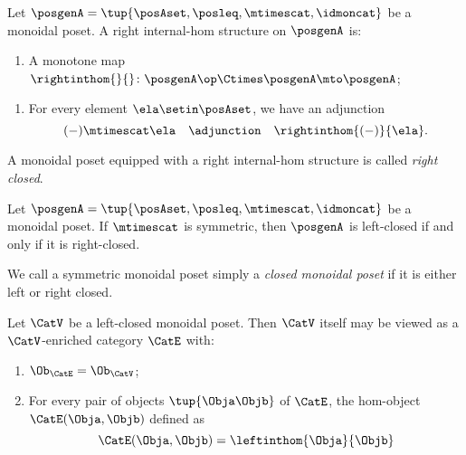 \begin{ctdefinition}
    \label{def:right-internal-hom-monoidal-poset}
    Let $\posgenA = \tup{\posAset, \posleq, \mtimescat, \idmoncat}$ be a monoidal poset.
    A right internal-hom structure on $\posgenA$ is:

    \constit
    \begin{enumerate}
        \item A monotone map $\rightinthom{}{} \colon \posgenA\op \Ctimes \posgenA \mto \posgenA$;
    \end{enumerate}

    \condit
    \begin{enumerate}
        \item For every element $\ela \setin \posAset$, we have an adjunction
              \begin{equation}
                  ( - ) \mtimescat \ela \quad \adjunction \quad \rightinthom{(-)}{\ela} .
              \end{equation}
    \end{enumerate}
    A monoidal poset equipped with a right internal-hom structure is called \emph{right closed}.
\end{ctdefinition}

\begin{lemma}
    \label{lem:symmetric-left-right-closed-monoidal-poset-cat}
    Let $\posgenA = \tup{\posAset, \posleq, \mtimescat, \idmoncat}$ be a monoidal poset.
    If $\mtimescat$ is symmetric, then $\posgenA$ is left-closed if and only if it is right-closed.
\end{lemma}

\begin{ctdefinition}
    \label{def:moindal-poset-cat-closed}
    We call a symmetric monoidal poset simply a \emph{closed monoidal poset} if it is either left or right closed.
\end{ctdefinition}

\begin{lemma}
    \label{lem:monoidal-closed-poset-self-enriched}
    Let $\CatV$ be a left-closed monoidal poset.
    Then $\CatV$ itself may be viewed as a $\CatV$-enriched category $\CatE$ with:
    \begin{enumerate}
        \item $\Ob_\CatE = \Ob_\CatV$;
        \item For every pair of objects $\tup{\Obja \Objb}$ of $\CatE$, the hom-object $\CatE(\Obja, \Objb)$ defined as
              \begin{equation}
                  \CatE(\Obja, \Objb) = \leftinthom{\Obja}{\Objb}
              \end{equation}
    \end{enumerate}
\end{lemma}

